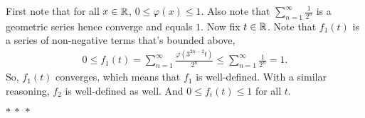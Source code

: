 \documentclass[12pt]{article}
\begin{document}
\begin{fproof}[3]
  
\end{fproof}
\newpage

\begin{fproof}[4(a)]
    First note that for all \(x \in \mathbb {R}\), \(0 \leq \varphi(x) \leq 1\).
    Also note that \(\sum_{n=1}^{\infty}\frac{1}{2^n}\) is a geometric series hence converge and equals \(1\).
    Now fix \(t \in \mathbb {R}\).
    Note that \(f_1(t)\) is a series of non-negative terms that's bounded above,
    \begin{align*}
        0 \leq f_1(t) =  \sum_{n=1}^{\infty} \frac{\varphi(3^{2n-2}t)}{2^n} \leq \sum_{n=1}^{\infty} \frac{1}{2^n} = 1.
    \end{align*}
    So, \(f_1(t)\) converges, which means that \(f_1\) is well-defined.
    With a similar reasoning, \(f_2\) is well-defined as well.
    And \(0 \leq f_i(t) \leq 1\) for all \(t\).

    \begin{center}
        \(\ast~\ast~\ast\)
    \end{center}



\end{fproof}

\begin{fproof}[4(b)]

\end{fproof}

\begin{fproof}[4(c)]

\end{fproof}
\end{document}
